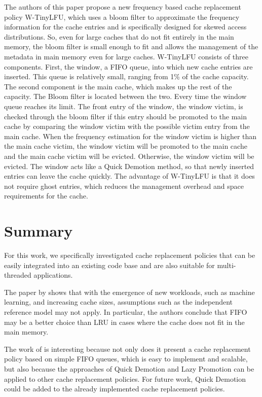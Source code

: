 \documentclass[
	12pt,
	a4paper,
	abstract,
	bibliography=totoc,
	chapterprefix,
	headings=openright,
	numbers=endperiod,
	parskip=half,
	twoside,
]{scrreprt}
\begin{document}
The authors of this paper propose a new frequency based cache replacement policy W-TinyLFU, which uses a bloom filter to 
approximate the frequency information for the cache entries and is specifically designed for skewed access distributions.
So, even for large caches that do not fit entirely in the main memory, the bloom filter is small enough to fit and allows the 
management of the metadata in main memory even for large caches.
W-TinyLFU consists of three components.
First, the window, a FIFO queue, into which new cache entries are inserted.
This queue is relatively small, ranging from 1\% of the cache capacity.
The second component is the main cache, which makes up the rest of the capacity.
The Bloom filter is located between the two.
Every time the window queue reaches its limit.
The front entry of the window, the window victim, is checked through the bloom filter
if this entry should be promoted to the main cache by comparing the window victim with the 
possible victim entry from the main cache.
When the frequency estimation for the window victim is higher than the main cache victim,
the window victim will be promoted to the main cache and the main cache victim will be evicted.
Otherwise, the window victim will be evicted. 
The window acts like a Quick Demotion method, so that newly inserted entries can leave the cache quickly.
The advantage of W-TinyLFU is that it does not require ghost entries, which reduces the management overhead and space requirements 
for the cache.

\section*{Summary}

For this work, we specifically investigated cache replacement policies that 
can be easily integrated into an existing code base and are also suitable 
for multi-threaded applications.

The paper by \cite{eytan2020s} shows that with the emergence of new workloads, such as machine learning, and 
increasing cache sizes, assumptions such as the independent reference model may not apply.
In particular, the authors conclude that FIFO may be a better choice than LRU in cases where the cache does not fit in the main memory.

The work of \cite{yang2023fifo} is interesting because not only does it present a cache replacement policy based on simple FIFO queues, 
which is easy to implement and scalable, but also because the approaches of Quick Demotion and Lazy Promotion 
can be applied to other cache replacement policies.
For future work, Quick Demotion could be added to the already implemented cache replacement policies.
\end{document}
